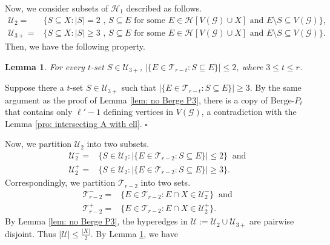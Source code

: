 \documentclass[12pt]{article}%
\newtheorem{lemma}[theorem]{Lemma}
\newenvironment{proof}{{\noindent\it Proof.}}{\hfill $\square$\par}
\newcommand{\ber}{\text{Berge-}}
\newcommand{\mh}{\mathcal{H}}
\newcommand{\mg}{\mathcal{G}}
\begin{document}
\noindent Now, we consider subsets of $\mh_1$ described as follows.
\begin{equation*}
    \begin{aligned}
        \mathcal{U}_{2}=&\{S\subseteq X: \text{$|S|=2$ , $S\subseteq E$ for some $E\in \mh[V(\mg)\cup X]$ and $E\setminus S\subseteq V(\mg)$}\},\\
         \mathcal{U}_{3+}=&\{S\subseteq X: \text{$|S|\geq 3$ , $S\subseteq E$ for some $E\in \mh[V(\mg)\cup X]$ and $E\setminus S\subseteq V(\mg)$}\}.
    \end{aligned}
\end{equation*}
\noindent Then, we have the following property.
\begin{lemma}\label{pro: degree of 3-set is at most 2}
    For every $t$-set $S\in \mathcal{U}_{3+}$, $|\{E\in \mathcal{T}_{r-t}:S\subseteq E \}|\leq 2$,  where $3\leq t\leq r$.
\end{lemma}
\begin{proof} Suppose there a $t$-set $S\in \mathcal{U}_{3+}$ such that $|\{E\in \mathcal{T}_{r-t}:S\subseteq E \}|\geq 3$. By the same argument as the proof of
     Lemma \ref{lem: no Berge P3}, there is a copy of $\ber P_{\ell}$ that contains only $\ell'-1$ defining vertices in $V(\mg)$, a contradiction with the Lemma \ref{pro: intersecting A with ell}.
\end{proof}
Now, we partition  $\mathcal{U}_2$ into two subsets.
\begin{equation*}
    \begin{aligned}
        \mathcal{U}_2^-=&\{S\in \mathcal{U}_2: |\{E\in \mathcal{T}_{r-2}:S\subseteq E\}|\leq 2\}~ \text{~and}\\
         \mathcal{U}_2^+=&\{S\in \mathcal{U}_2: |\{E\in \mathcal{T}_{r-2}:S\subseteq E\}|\geq 3\}.
    \end{aligned}
\end{equation*}
Correspondingly, we partition $\mathcal{T}_{r-2}$ into two sets.
\begin{equation*}
    \begin{aligned}
        \mathcal{T}_{r-2}^-=&\{E\in \mathcal{T}_{r-2}: E\cap X\in \mathcal{U}_2^- \} ~\text{~and}\\
        \mathcal{T}_{r-2}^+=&\{E\in \mathcal{T}_{r-2}: E\cap X\in \mathcal{U}_2^+ \}.
    \end{aligned}
\end{equation*}
By Lemma \ref{lem: no Berge P3}, the hyperedges in $\mathcal{U}:=\mathcal{U}_2\cup \mathcal{U}_{3+}$ are pairwise disjoint. Thus $|\mathcal{U}|\leq \frac{|X|}{2}$. By Lemma \ref{pro: degree of 3-set is at most 2}, we have
\end{document}
